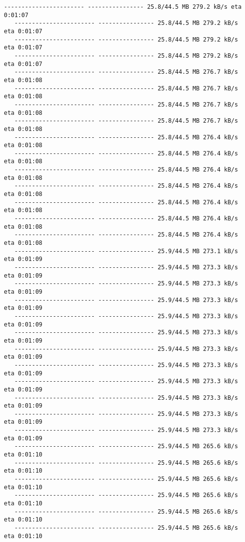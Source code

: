 \documentclass[11pt]{article}
\begin{document}
\begin{Verbatim}[commandchars=\\\{\}]
   ----------------------- ---------------- 25.8/44.5 MB 279.2 kB/s eta 0:01:07
   ----------------------- ---------------- 25.8/44.5 MB 279.2 kB/s eta 0:01:07
   ----------------------- ---------------- 25.8/44.5 MB 279.2 kB/s eta 0:01:07
   ----------------------- ---------------- 25.8/44.5 MB 279.2 kB/s eta 0:01:07
   ----------------------- ---------------- 25.8/44.5 MB 276.7 kB/s eta 0:01:08
   ----------------------- ---------------- 25.8/44.5 MB 276.7 kB/s eta 0:01:08
   ----------------------- ---------------- 25.8/44.5 MB 276.7 kB/s eta 0:01:08
   ----------------------- ---------------- 25.8/44.5 MB 276.7 kB/s eta 0:01:08
   ----------------------- ---------------- 25.8/44.5 MB 276.4 kB/s eta 0:01:08
   ----------------------- ---------------- 25.8/44.5 MB 276.4 kB/s eta 0:01:08
   ----------------------- ---------------- 25.8/44.5 MB 276.4 kB/s eta 0:01:08
   ----------------------- ---------------- 25.8/44.5 MB 276.4 kB/s eta 0:01:08
   ----------------------- ---------------- 25.8/44.5 MB 276.4 kB/s eta 0:01:08
   ----------------------- ---------------- 25.8/44.5 MB 276.4 kB/s eta 0:01:08
   ----------------------- ---------------- 25.8/44.5 MB 276.4 kB/s eta 0:01:08
   ----------------------- ---------------- 25.9/44.5 MB 273.1 kB/s eta 0:01:09
   ----------------------- ---------------- 25.9/44.5 MB 273.3 kB/s eta 0:01:09
   ----------------------- ---------------- 25.9/44.5 MB 273.3 kB/s eta 0:01:09
   ----------------------- ---------------- 25.9/44.5 MB 273.3 kB/s eta 0:01:09
   ----------------------- ---------------- 25.9/44.5 MB 273.3 kB/s eta 0:01:09
   ----------------------- ---------------- 25.9/44.5 MB 273.3 kB/s eta 0:01:09
   ----------------------- ---------------- 25.9/44.5 MB 273.3 kB/s eta 0:01:09
   ----------------------- ---------------- 25.9/44.5 MB 273.3 kB/s eta 0:01:09
   ----------------------- ---------------- 25.9/44.5 MB 273.3 kB/s eta 0:01:09
   ----------------------- ---------------- 25.9/44.5 MB 273.3 kB/s eta 0:01:09
   ----------------------- ---------------- 25.9/44.5 MB 273.3 kB/s eta 0:01:09
   ----------------------- ---------------- 25.9/44.5 MB 273.3 kB/s eta 0:01:09
   ----------------------- ---------------- 25.9/44.5 MB 265.6 kB/s eta 0:01:10
   ----------------------- ---------------- 25.9/44.5 MB 265.6 kB/s eta 0:01:10
   ----------------------- ---------------- 25.9/44.5 MB 265.6 kB/s eta 0:01:10
   ----------------------- ---------------- 25.9/44.5 MB 265.6 kB/s eta 0:01:10
   ----------------------- ---------------- 25.9/44.5 MB 265.6 kB/s eta 0:01:10
   ----------------------- ---------------- 25.9/44.5 MB 265.6 kB/s eta 0:01:10

\end{Verbatim}
\end{document}
